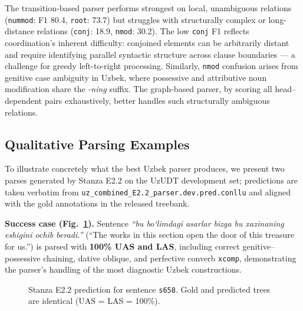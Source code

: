 \documentclass[10pt,conference,a4paper]{IEEEtran_EDM}
\begin{document}
The transition-based parser performs strongest on local, unambiguous relations (\texttt{nummod}: F1 80.4, \texttt{root}: 73.7) but struggles with structurally complex or long-distance relations (\texttt{conj}: 18.9, \texttt{nmod}: 30.2). The low \texttt{conj} F1 reflects coordination's inherent difficulty: conjoined elements can be arbitrarily distant and require identifying parallel syntactic structure across clause boundaries --- a challenge for greedy left-to-right processing. Similarly, \texttt{nmod} confusion arises from genitive case ambiguity in Uzbek, where possessive and attributive noun modification share the \textit{-ning} suffix. The graph-based parser, by scoring all head--dependent pairs exhaustively, better handles such structurally ambiguous relations.

\subsection{Qualitative Parsing Examples}
\label{sec:qualitative}

To illustrate concretely what the best Uzbek parser produces, we present two parses generated by Stanza E2.2 on the UzUDT development set; predictions are taken verbatim from \texttt{uz\_combined\_E2.2\_parser.dev.pred.conllu} and aligned with the gold annotations in the released treebank.

\textbf{Success case (Fig.~\ref{fig:parse_success}).} Sentence \textit{``bu bo\textquoteleft{}limdagi asarlar bizga bu xazinaning eshigini ochib beradi.''} (``The works in this section open the door of this treasure for us.'') is parsed with \textbf{100\% UAS and LAS}, including correct genitive--possessive chaining, dative oblique, and perfective converb \texttt{xcomp}, demonstrating the parser's handling of the most diagnostic Uzbek constructions.

\begin{figure}[htbp]
\centering
{}
\caption{Stanza E2.2 prediction for sentence \texttt{s658}. Gold and predicted trees are identical (UAS = LAS = 100\%).}
\label{fig:parse_success}
\end{figure}
\end{document}
